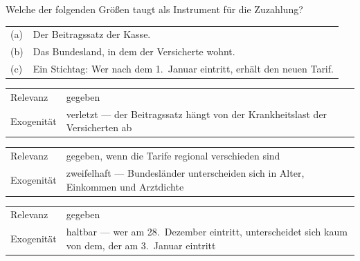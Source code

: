 \begin{aufgabe}
Welche der folgenden Größen taugt als Instrument für die Zuzahlung?
\begin{center}
{\small
\renewcommand{\arraystretch}{1.5}
\begin{tabular}{@{}P{1.0cm}P{7.4cm}@{}}
\toprule
(a) & Der Beitragssatz der Kasse.\\
(b) & Das Bundesland, in dem der Versicherte wohnt.\\
(c) & Ein Stichtag: Wer nach dem 1.\ Januar eintritt, erhält den neuen Tarif.\\
\bottomrule
\end{tabular}}
\end{center}

\loesung
{}
\begin{center}
{\small
\renewcommand{\arraystretch}{1.48}
\begin{tabular}{@{}P{2.4cm}P{5.8cm}@{}}
\toprule
Relevanz & gegeben\\
Exogenität & \textcolor{akzent}{verletzt} --- der Beitragssatz hängt von der Krankheitslast der Versicherten ab\\
\bottomrule
\end{tabular}}
\end{center}

\begin{center}
{\small
\renewcommand{\arraystretch}{1.48}
\begin{tabular}{@{}P{2.4cm}P{5.8cm}@{}}
\toprule
Relevanz & gegeben, wenn die Tarife regional verschieden sind\\
Exogenität & \textcolor{akzent}{zweifelhaft} --- Bundesländer unterscheiden sich in Alter, Einkommen und Arztdichte\\
\bottomrule
\end{tabular}}
\end{center}

\begin{center}
{\small
\renewcommand{\arraystretch}{1.48}
\begin{tabular}{@{}P{2.4cm}P{5.8cm}@{}}
\toprule
Relevanz & gegeben\\
Exogenität & \textcolor{gruen}{haltbar} --- wer am 28.\ Dezember eintritt, unterscheidet sich kaum von dem, der am 3.\ Januar eintritt\\
\bottomrule
\end{tabular}}
\end{center}


\end{aufgabe}
